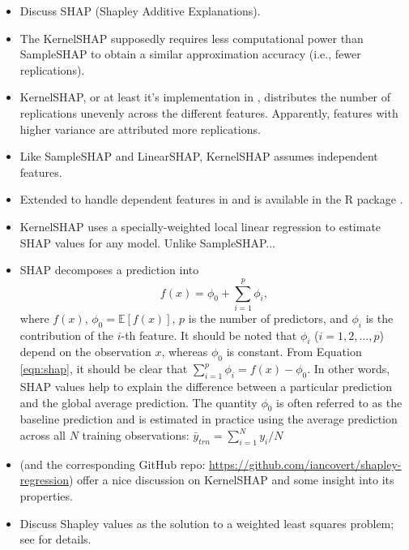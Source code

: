 \begin{itemize}

  \item Discuss SHAP (Shapley Additive Explanations).

  \item The KernelSHAP supposedly requires less computational power than SampleSHAP to obtain a similar approximation accuracy (i.e., fewer replications).

  \item KernelSHAP, or at least it's implementation in , distributes the number of replications unevenly across the different features. Apparently, features with higher variance are attributed more replications. 

  \item Like SampleSHAP and LinearSHAP, KernelSHAP assumes independent features.

  \item Extended to handle dependent features in \citet{aas-2020-explaining} and is available in the R package  \citep{R-shapr}. 

  \item KernelSHAP \citep{lundberg-2017-KernelSHAP} uses a specially-weighted local linear regression to estimate SHAP values for any model. Unlike SampleSHAP...

  \item SHAP decomposes a prediction into 
\begin{equation}
\label{eqn:shap}
  f\left(x\right) = \phi_0 + \sum_{i = 1} ^ p \phi_i,
\end{equation}
where $f\left(x\right)$, $\phi_0 = \mathbb{E}\left[f\left(x\right)\right]$, $p$ is the number of predictors, and $\phi_i$ is the contribution of the $i$-th feature. It should be noted that $\phi_i$ ($i = 1, 2, \dots, p$) depend on the observation $x$, whereas $\phi_0$ is constant. From Equation \eqref{eqn:shap}, it should be clear that $\sum_{i = 1}^p \phi_i = f\left(x\right) - \phi_0$. In other words, SHAP values help to explain the difference between a particular prediction and the global average prediction. The quantity $\phi_0$ is often referred to as the baseline prediction and is estimated in practice using the average prediction across all $N$ training observations: $\bar{y}_{trn} = \sum_{i = 1}^N y_i / N$

  \item \citet{covert-2021-improving} (and the corresponding GitHub repo: \url{https://github.com/iancovert/shapley-regression}) offer a nice discussion on KernelSHAP and some insight into its properties.

  \item Discuss Shapley values as the solution to a weighted least squares problem; see \citet{charnes-1988-extremal} for details.

\end{itemize}


